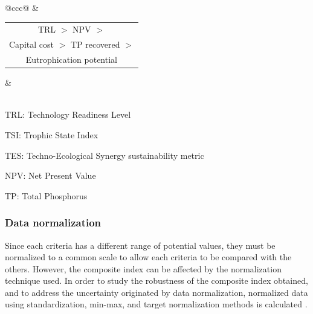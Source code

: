 \documentclass[authoryear]{elsarticle}
\begin{document}
\begin{table}[]
\begin{threeparttable}
\begin{tabular}{@{}ccc@{}}
			      & \begin{tabular}[c]{@{}c@{}}TRL $>$ NPV $>$ \\ Capital cost $>$ TP recovered $>$ \\ Eutrophication potential\end{tabular}  &                                                      \\  \\ \bottomrule
		\end{tabular}
		\begin{tablenotes}
			\item TRL: Technology Readiness Level
			\item TSI: Trophic State Index
			\item TES: Techno-Ecological Synergy sustainability metric
			\item NPV: Net Present Value
			\item TP: Total Phosphorus
		\end{tablenotes}
	\end{threeparttable}
\end{table}

\subsubsection{Data normalization}
Since each criteria has a different range of potential values, they must be normalized to a common scale to allow each criteria to be compared with the others. However, the composite index 
can be affected by the normalization technique used. In order to study the robustness of the composite index obtained, and to address the uncertainty originated by data normalization, normalized data using standardization, min-max, and target normalization methods is calculated
\citep{HandbookCompositeIndicators}.
\end{document}
